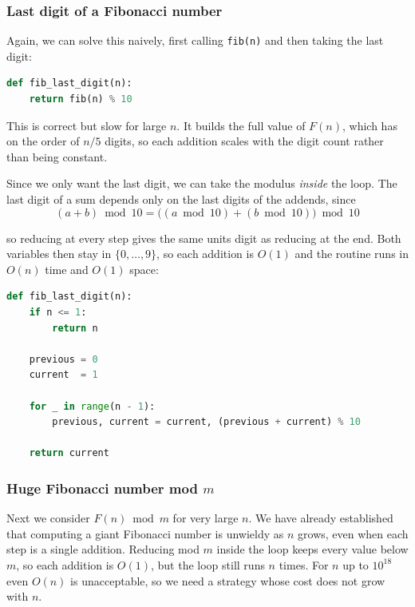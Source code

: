\bigskip

\subsubsection{Last digit of a Fibonacci number}

\medskip

Again, we can solve this naively, first calling \texttt{fib(n)} and then taking the last digit:

\begin{lstlisting}[language=Python]
def fib_last_digit(n):
    return fib(n) % 10
\end{lstlisting}

This is correct but slow for large $n$. It builds the full value of $F(n)$, which has on the order of $n/5$ digits, so each addition scales with the digit count rather than being constant.

Since we only want the last digit, we can take the modulus \textit{inside} the loop. The last digit of a sum depends only on the last digits of the addends, since
\[
(a + b) \bmod 10 = \big((a \bmod 10) + (b \bmod 10)\big) \bmod 10
\]

\newpage

so reducing at every step gives the same units digit as reducing at the end. Both variables then stay in $\{0, \dots, 9\}$, so each addition is $O(1)$ and the routine runs in $O(n)$ time and $O(1)$ space:

\begin{lstlisting}[language=Python]
def fib_last_digit(n):
    if n <= 1:
        return n

    previous = 0
    current  = 1

    for _ in range(n - 1):
        previous, current = current, (previous + current) % 10

    return current
\end{lstlisting}

\bigskip

\subsubsection{Huge Fibonacci number mod \texorpdfstring{$m$}{m}}

Next we consider $F(n) \bmod m$ for very large $n$. We have already established that computing a giant Fibonacci number is unwieldy as $n$ grows, even when each step is a single addition. Reducing mod $m$ inside the loop keeps every value below $m$, so each addition is $O(1)$, but the loop still runs $n$ times. For $n$ up to $10^{18}$ even $O(n)$ is unacceptable, so we need a strategy whose cost does not grow with $n$.


